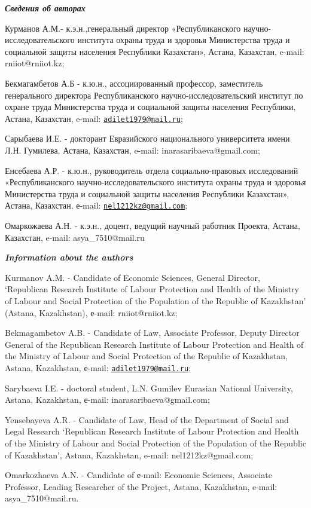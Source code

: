 \begin{authorinfo}

  \hspace{1em}\emph{{\bfseries Сведения об авторах}}

Курманов А.М.- к.э.н.,генеральный директор «Республиканского
научно-исследовательского института охраны труда и здоровья Министерства
труда и социальной защиты населения Республики Казахстан», Астана,
Казахстан, e-mail: rniiot@rniiot.kz;

Бекмагамбетов А.Б - к.ю.н., ассоциированный профессор, заместитель
генерального директора Республиканского научно-исследовательский
институт по охране труда Министерства труда и социальной защиты
населения Республики, Астана, Казахстан, e-mail:
\href{mailto:adilet1979@mail.ru}{\nolinkurl{adilet1979@mail.ru}};

Сарыбаева И.Е. - докторант Евразийского национального университета имени
Л.Н. Гумилева, Астана, Казахстан, e-mail: inarasaribaeva@gmail.com;

Енсебаева А.Р. - к.ю.н., руководитель отдела социально-правовых
исследований «Республиканского научно-исследовательского института
охраны труда и здоровья Министерства труда и социальной защиты населения
Республики Казахстан», Астана, Казахстан, е-mail:
\href{mailto:nel1212kz@gmail.com}{\nolinkurl{nel1212kz@gmail.com}};

Омаркожаева А.Н. - к.э.н., доцент, ведущий научный работник Проекта,
Астана, Казахстан, e-mail: asya\_7510@mail.ru

\hspace{1em}\emph{{\bfseries Information about the authors}}

Kurmanov A.M. - Candidate of Economic Sciences, General Director,
`Republican Research Institute of Labour Protection and Health of the
Ministry of Labour and Social Protection of the Population of the
Republic of Kazakhstan' (Astana, Kazakhstan), е-mail: rniiot@rniiot.kz;

Bekmagambetov A.B. - Candidate of Law, Associate Professor, Deputy
Director General of the Republican Research Institute of Labour
Protection and Health of the Ministry of Labour and Social Protection of
the Republic of Kazakhstan, Astana, Kazakhstan, е-mail:
\href{mailto:adilet1979@mail.ru}{\nolinkurl{adilet1979@mail.ru}};

Sarybaeva I.E. - doctoral student, L.N. Gumilev Eurasian National
University, Astana, Kazakhstan, е-mail: inarasaribaeva@gmail.com;

Yensebayeva A.R. - Candidate of Law, Head of the Department of Social
and Legal Research `Republican Research Institute of Labour Protection
and Health of the Ministry of Labour and Social Protection of the
Population of the Republic of Kazakhstan', Astana, Kazakhstan, e-mail:
nel1212kz@gmail.com;

Omarkozhaeva A.N. - Candidate of е-mail: Economic Sciences, Associate
Professor, Leading Researcher of the Project, Astana, Kazakhstan,
e-mail: asya\_7510@mail.ru.
\end{authorinfo}
